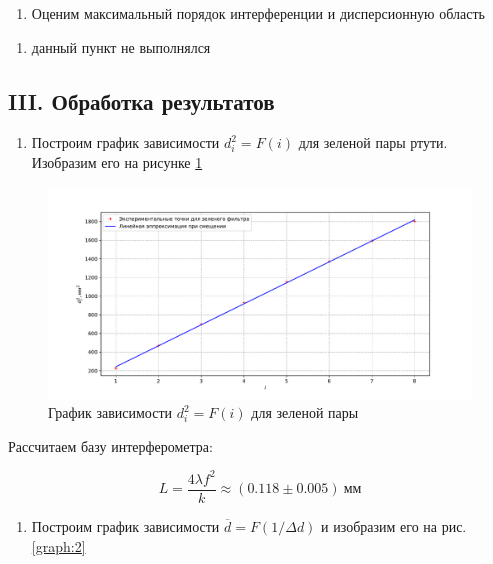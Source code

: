 \documentclass[a4paper,12pt]{article}
\begin{document}
\begin{enumerate}[resume]
    \item Оценим максимальный порядок интерференции и дисперсионную область
\end{enumerate}

\begin{enumerate}[resume]
    \item данный пункт не выполнялся
\end{enumerate}

\subsection*{III. Обработка результатов}

\begin{enumerate}
    \item Построим график зависимости $d_i^2 = F(i)$ для зеленой пары ртути. Изобразим его на рисунке \ref{graph:1}
\end{enumerate}

\FloatBarrier
\begin{figure}[!h]
    \centering
    \includegraphics[scale=0.65]{graph_green.pdf}
    \caption{График зависимости $d_i^2 = F(i)$ для зеленой пары}
    \label{graph:1}
\end{figure}
\FloatBarrier

Рассчитаем базу интерферометра:

\begin{equation*}
    L = \frac{4\lambda f^2}{k} \approx (0.118 \pm 0.005) \ \text{мм}
\end{equation*}

\clearpage

\begin{enumerate}[resume]
    \item Построим график зависимости $\overline{d} = F(1/\Delta d)$ и изобразим его на рис. \ref{graph:2}
\end{enumerate}
\end{document}
